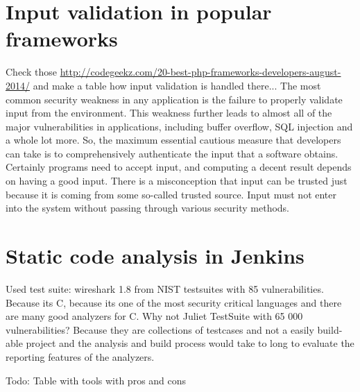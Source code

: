 \documentclass[conference]{IEEEtran}
\begin{document}
\section{Input validation in popular frameworks}
\label{sec:input_validation}
Check those \url{http://codegeekz.com/20-best-php-frameworks-developers-august-2014/} and make a table how input validation is handled there...
The most common security weakness in any application is the failure to properly validate input from the environment. This weakness further leads to almost all of the major vulnerabilities in applications, including buffer overflow, SQL injection and a whole lot more. So, the maximum essential cautious measure that developers can take is to comprehensively authenticate the input that a software obtains. Certainly programs need to accept input, and computing a decent result depends on having a good input. There is a misconception that input can be trusted just because it is coming from some so-called trusted source. Input must not enter into the system without passing through various security methods.

\section{Static code analysis in Jenkins}
\label{sec:static_code_analysis_jenkins}
Used test suite: wireshark 1.8 from NIST testsuites with 85 vulnerabilities.
Because its C, because its one of the most security critical languages and there are many good analyzers for C.
Why not Juliet TestSuite with 65 000 vulnerabilities?
Because they are collections of testcases and not a easily build-able project and the analysis and build process would take to long to evaluate the reporting features of the analyzers.


Todo: Table with tools with pros and cons
\end{document}
